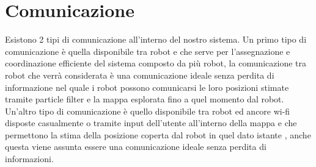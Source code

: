 \section{Comunicazione}
Esistono 2 tipi di comunicazione all'interno del nostro sistema. Un primo tipo di comunicazione è quella disponibile tra robot e che serve per l'assegnazione e coordinazione efficiente del sistema composto da più robot, la comunicazione tra robot che verrà considerata è una comunicazione ideale senza perdita di informazione nel quale i robot possono comunicarsi le loro posizioni stimate tramite particle filter e la mappa esplorata fino a quel momento dal robot. Un'altro tipo di comunicazione è quello disponibile tra robot ed ancore wi-fi disposte casualmente o tramite input dell'utente all'interno della mappa e che permettono la stima della posizione coperta dal robot in quel dato istante , anche questa viene assunta essere una comunicazione ideale senza perdita di informazioni.